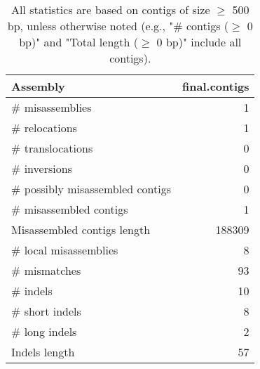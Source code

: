 \documentclass[12pt,a4paper]{article}
\begin{document}
\begin{table}[ht]
\begin{center}
\caption{All statistics are based on contigs of size $\geq$ 500 bp, unless otherwise noted (e.g., "\# contigs ($\geq$ 0 bp)" and "Total length ($\geq$ 0 bp)" include all contigs).}
\begin{tabular}{|l*{1}{|r}|}
\hline
Assembly & final.contigs \\ \hline
\# misassemblies & 1 \\ \hline
\hspace{5mm}\# relocations & 1 \\ \hline
\hspace{5mm}\# translocations & 0 \\ \hline
\hspace{5mm}\# inversions & 0 \\ \hline
\# possibly misassembled contigs & 0 \\ \hline
\# misassembled contigs & 1 \\ \hline
Misassembled contigs length & 188309 \\ \hline
\# local misassemblies & 8 \\ \hline
\# mismatches & 93 \\ \hline
\# indels & 10 \\ \hline
\hspace{5mm}\# short indels & 8 \\ \hline
\hspace{5mm}\# long indels & 2 \\ \hline
Indels length & 57 \\ \hline
\end{tabular}
\end{center}
\end{table}
\end{document}
